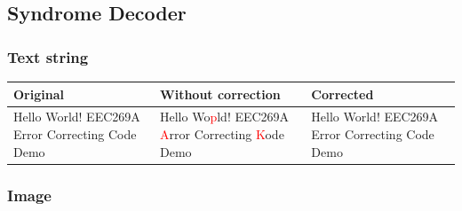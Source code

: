 \documentclass{article}
\begin{document}
\subsection{Syndrome Decoder}
\subsubsection{Text string}

\begin{center}
    \renewcommand{\arraystretch}{1.5}
    \begin{tabulary}{\textwidth}{ |L|L|L| } 
    \hline
    \textbf{Original} & \textbf{Without correction} & \textbf{Corrected} \\
    \hline
    Hello World! EEC269A Error Correcting Code Demo & Hello Wo\textcolor{red}{p}ld! EEC269A \textcolor{red}{A}rror Correcting \textcolor{red}{K}ode Demo & Hello World! EEC269A Error Correcting Code Demo \\
    \hline
    \end{tabulary}
\end{center}



\subsubsection{Image}
\end{document}
